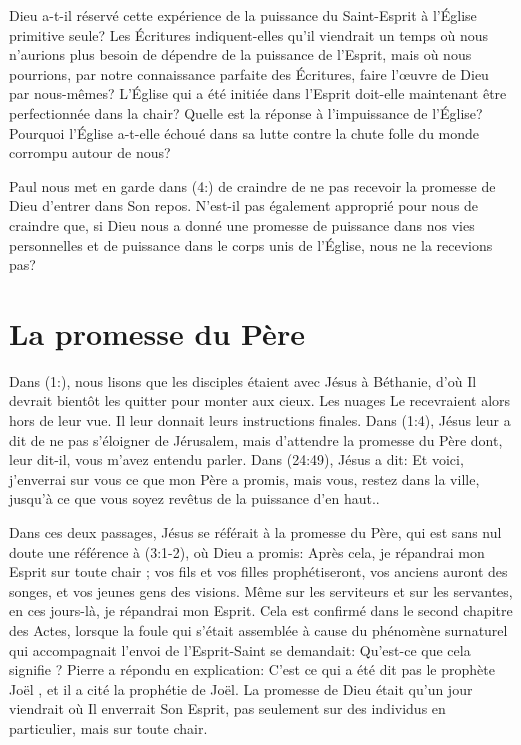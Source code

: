 Dieu a-t-il réservé cette expérience de la puissance du Saint-Esprit à
 l'Église primitive seule? Les Écritures indiquent-elles qu'il viendrait
 un temps où nous n'aurions plus besoin de dépendre de la puissance
 de l'Esprit, mais où nous pourrions, par notre connaissance parfaite
 des Écritures, faire l'œuvre de Dieu par nous-mêmes? L'Église qui a été
 initiée dans l'Esprit doit-elle maintenant être perfectionnée dans
 la chair?
 Quelle est la réponse à l'impuissance de l'Église?
 Pourquoi l'Église a-t-elle échoué dans sa lutte contre la chute folle
 du monde corrompu autour de nous?

Paul nous met en garde dans (4:) de craindre de ne pas
 recevoir la promesse de Dieu d'entrer dans Son repos.
 N'est-il pas également approprié pour nous de craindre que, si Dieu
 nous a donné une promesse de puissance dans nos vies personnelles et de
 puissance dans le corps unis de l'Église, nous ne la recevions pas?


\section*{La promesse du Père}

Dans (1:), nous lisons que les disciples étaient avec
 Jésus à Béthanie, d'où Il devrait bientôt les quitter pour monter
 aux cieux.
 Les nuages Le recevraient alors hors de leur vue.
 Il leur donnait leurs instructions finales.
 Dans (1:4), Jésus leur a dit de \og ne pas s'éloigner
 de Jérusalem, mais d'attendre la promesse du Père dont, leur dit-il,
 vous m'avez entendu parler. \fg{}
 Dans (24:49), Jésus a dit\space:
 \og Et voici, j'enverrai sur vous ce que mon Père a promis, mais vous,
 restez dans la ville, jusqu'à ce que vous soyez revêtus de la puissance
 d'en haut.\fg{}.

Dans ces deux passages, Jésus se référait à la promesse du Père, qui est
 sans nul doute une référence à (3:1-2), où Dieu a promis\space:
 \og Après cela, je répandrai mon Esprit sur toute chair ;
 vos fils et vos filles prophétiseront, vos anciens auront des songes,
 et vos jeunes gens des visions.
 Même sur les serviteurs et sur les servantes,
 en ces jours-là, je répandrai mon Esprit. \fg{}
 Cela est confirmé dans le second chapitre des Actes, lorsque la foule qui
 s'était assemblée à cause du phénomène surnaturel qui accompagnait l'envoi
 de l'Esprit-Saint se demandait\space:
 \og Qu'est-ce que cela signifie ? \fg{}
 Pierre a répondu en explication\space:
 \og C'est ce qui a été dit pas le prophète Joël \fg{},
 et il a cité la prophétie de Joël.
 La promesse de Dieu était qu'un jour viendrait où Il enverrait Son Esprit,
 pas seulement sur des individus en particulier, mais sur toute chair.

